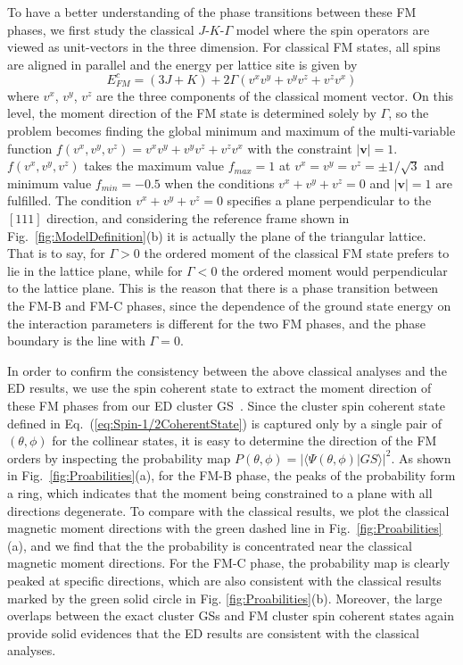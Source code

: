 \documentclass[aps,prb,reprint,amsfonts,amsmath,amssymb,showpacs,groupedaddress,superscriptaddress]{revtex4-1}
\begin{document}
To have a better understanding of the phase transitions between these FM phases, we first study the classical $J$-$K$-$\Gamma$ model where the spin operators are viewed as unit-vectors in the three dimension. For classical FM states, all spins are aligned in parallel and the energy per lattice site is given by
\begin{equation}
    E_{FM}^{c} = (3J + K) + 2 \Gamma (v^x v^y + v^y v^z + v^z v^x) \label{eq:EcFM}
\end{equation}
where $v^x$, $v^y$, $v^z$ are the three components of the classical moment vector. On this level, the moment direction of the FM state is determined solely by $\Gamma$, so the problem becomes finding the global minimum and maximum of the multi-variable function $f(v^x, v^y, v^z) = v^x v^y + v^y v^z + v^z v^x$ with the constraint $|\bm{v}| = 1$. $f(v^x, v^y, v^z)$ takes the maximum value $f_{max}=1$ at $v^x=v^y=v^z=\pm 1/\sqrt{3}$ and minimum value $f_{min}=-0.5$ when the conditions $v^x + v^y + v^z = 0$ and $|\bm{v}| = 1$ are fulfilled. The condition $v^x + v^y + v^z = 0$ specifies a plane perpendicular to the $[111]$ direction, and considering the reference frame shown in Fig.~\ref{fig:ModelDefinition}(b) it is actually the plane of the triangular lattice. That is to say, for $\Gamma > 0$ the ordered moment of the classical FM state prefers to lie in the lattice plane, while for $\Gamma<0$ the ordered moment would perpendicular to the lattice plane. This is the reason that there is a phase transition between the FM-B and FM-C phases, since the dependence of the ground state energy on the interaction parameters is different for the two FM phases, and the phase boundary is the line with $\Gamma=0$.

In order to confirm the consistency between the above classical analyses and the ED results, we use the spin coherent state to extract the moment direction of these FM phases from our ED cluster GS~\cite{PhysRevB.94.064435}. Since the cluster spin coherent state defined in Eq.~(\ref{eq:Spin-1/2CoherentState}) is captured only by a single pair of $(\theta, \phi)$ for the collinear states, it is easy to determine the direction of the FM orders by inspecting the probability map $P(\theta, \phi) = | \langle \Psi (\theta, \phi) | GS \rangle |^2$. As shown in Fig.~\ref{fig:Proabilities}(a), for the FM-B phase, the peaks of the probability form a ring, which indicates that the moment being constrained to a plane with all directions degenerate. To compare with the classical results, we plot the classical magnetic moment directions with the green dashed line in Fig.~\ref{fig:Proabilities}(a), and we find that the the probability is concentrated near the classical magnetic moment directions. For the FM-C phase, the probability map is clearly peaked at specific directions, which are also consistent with the classical results marked by the green solid circle in Fig. \ref{fig:Proabilities}(b). Moreover, the large overlaps between the exact cluster GSs and FM cluster spin coherent states again provide solid evidences that the ED results are consistent with the classical analyses.
\end{document}
